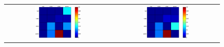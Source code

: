 \documentclass{article}
\begin{document}

\begin{figure}[!ht] \centering
  \begin{tabular}{cc}
    \includegraphics[width=0.45\textwidth]{confMat_1.eps} &
    \includegraphics[width=0.45\textwidth]{confMat_2.eps} \\
  \end{tabular}
\end{figure}
\end{document}
